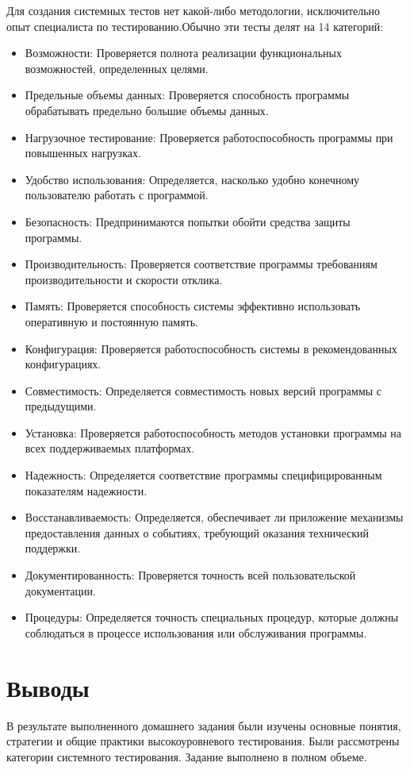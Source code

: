 \documentclass[12pt]{article}
\begin{document}
    Для создания системных тестов нет какой-либо методологии, исключительно опыт специалиста по тестированию.Обычно эти тесты делят на 14 категорий:
    \begin{itemize}
        \item Возможности: Проверяется   полнота   реализации функциональных возможностей, определенных целями.
        \item Предельные объемы данных: Проверяется способность программы обрабатывать предельно большие объемы данных.
        \item Нагрузочное тестирование: Проверяется работоспособность программы при повышенных нагрузках.
        \item Удобство использования: Определяется, насколько удобно конечному  пользователю  работать  с программой.
        \item Безопасность: Предпринимаются  попытки  обойти средства защиты программы.
        \item Производительность: Проверяется соответствие программы требованиям производительности и скорости отклика.
        \item Память: Проверяется  способность  системы эффективно использовать оперативную и постоянную память.
        \item Конфигурация: Проверяется работоспособность системы в рекомендованных конфигурациях.
        \item Совместимость: Определяется  совместимость  новых версий программы с предыдущими.
        \item Установка: Проверяется работоспособность методов  установки программы  на всех поддерживаемых платформах.
        \item Надежность: Определяется соответствие программы специфицированным показателям надежности.
        \item Восстанавливаемость: Определяется, обеспечивает    ли приложение механизмы предоставления  данных  о  событиях, требующий   оказания   технический поддержки.
        \item Документированность: Проверяется точность всей пользовательской документации.
        \item Процедуры: Определяется точность специальных процедур, которые должны соблюдаться в процессе использования   или   обслуживания программы.
    \end{itemize}

    \section*{Выводы}
    В результате выполненного домашнего задания были изучены основные понятия, стратегии и общие практики высокоуровневого тестирования. Были рассмотрены категории системного тестирования. Задание выполнено в полном объеме.
    \newpage
\end{document}
